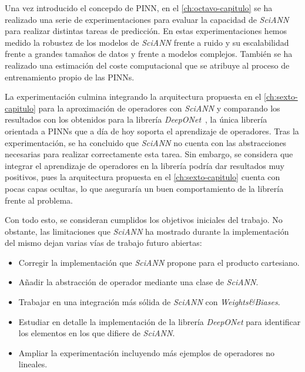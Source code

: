 Una vez introducido el concepdo de PINN, en el \autoref{ch:octavo-capitulo} se ha realizado una serie de experimentaciones para evaluar la capacidad de  \textit{SciANN} para realizar distintas tareas de predicción. En estas experimentaciones hemos medido la robustez de los modelos de  \textit{SciANN} frente a ruido y su escalabilidad frente a grandes tamaños de datos y frente a modelos complejos. También se ha realizado una estimación del coste computacional que se atribuye al proceso de entrenamiento propio de las PINNs. 

La experimentación culmina integrando la arquitectura propuesta en el \autoref{ch:sexto-capitulo} para la aproximación de operadores con \textit{SciANN} y comparando los resultados con los obtenidos para la librería \textit{DeepONet}~\cite{lu2024deeponet}, la única librería orientada a PINNs que a día de hoy soporta el aprendizaje de operadores. Tras la experimentación, se ha concluido que \textit{SciANN} no cuenta con las abstracciones necesarias para realizar correctamente esta tarea. Sin embargo, se considera que integrar el aprendizaje de operadores en la librería podría dar resultados muy positivos, pues la arquitectura propuesta en el \autoref{ch:sexto-capitulo} cuenta con pocas capas ocultas, lo que aseguraría un buen comportamiento de la librería frente al problema. 

Con todo esto, se consideran cumplidos los objetivos iniciales del trabajo. No obstante, las limitaciones que  \textit{SciANN} ha mostrado durante la implementación del mismo dejan varias vías de trabajo futuro abiertas:

\begin{itemize}
    \item Corregir la implementación que \textit{SciANN} propone para el producto cartesiano.
    \item Añadir la abstracción de operador mediante una clase de \textit{SciANN}.
    \item Trabajar en una integración más sólida de \textit{SciANN} con \textit{Weights\&{Biases}}. 
    \item Estudiar en detalle la implementación de la librería \textit{DeepONet} para identificar los elementos en los que difiere de \textit{SciANN}.
    \item Ampliar la experimentación incluyendo más ejemplos de operadores no lineales. 
\end{itemize}